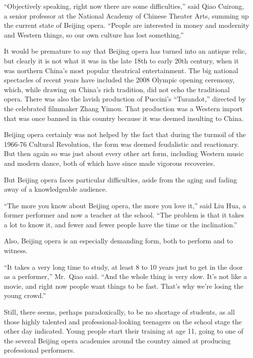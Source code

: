 ﻿\documentclass[12pt]{article}
\begin{document}
``Objectively speaking, right now there are some difficulties,'' said Qiao Cuirong, a senior
professor at the National Academy of Chinese Theater Arts, summing up the current state of Beijing
opera. ``People are interested in money and modernity and Western things, so our own culture has
lost something.''

It would be premature to say that Beijing opera has turned into an antique relic, but clearly it is
not what it was in the late 18th to early 20th century, when it was northern China's most popular
theatrical entertainment. The big national spectacles of recent years have included the 2008 Olympic
opening ceremony, which, while drawing on China's rich tradition, did not echo the traditional
opera. There was also the lavish production of Puccini's ``Turandot,'' directed by the celebrated
filmmaker Zhang Yimou. That production was a Western import that was once banned in this country
because it was deemed insulting to China.

Beijing opera certainly was not helped by the fact that during the turmoil of the 1966-76 Cultural
Revolution, the form was deemed feudalistic and reactionary. But then again so was just about every
other art form, including Western music and modern dance, both of which have since made vigorous
recoveries.

But Beijing opera faces particular difficulties, aside from the aging and fading away of a
knowledgeable audience.

``The more you know about Beijing opera, the more you love it,'' said Liu Hua, a former performer
and now a teacher at the school. ``The problem is that it takes a lot to know it, and fewer and
fewer people have the time or the inclination.''

Also, Beijing opera is an especially demanding form, both to perform and to witness.

``It takes a very long time to study, at least 8 to 10 years just to get in the door as a
performer,'' Mr.~Qiao said. ``And the whole thing is very slow. It's not like a movie, and right now
people want things to be fast. That's why we're losing the young crowd.''

Still, there seems, perhaps paradoxically, to be no shortage of students, as all those highly
talented and professional-looking teenagers on the school stage the other day indicated. Young
people start their training at age 11, going to one of the several Beijing opera academies around
the country aimed at producing professional performers.
\end{document}
